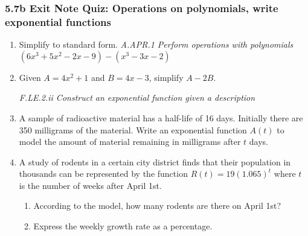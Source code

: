 \documentclass[12pt, twoside]{article}
\begin{document}
\subsubsection*{5.7b Exit Note Quiz: Operations on polynomials, write exponential functions}
\begin{enumerate}

\item Simplify to standard form. \hfill \emph{A.APR.1 Perform operations with polynomials} \\[0.25cm]
$(6x^3 + 5x^2 - 2x - 9) - (x^3 - 3x - 2)$ \vspace{4cm}

\item Given $A = 4x^2+1$ and $B = 4x-3$, simplify $A - 2B$. \vspace{5cm}


\; \hfill \emph{F.LE.2.ii Construct an exponential function given a description}
\item A sample of radioactive material has a half-life of 16 days. Initially there are 350 milligrams of the material. Write an exponential function $A(t)$ to model the amount of material remaining in milligrams after $t$ days. \vspace{2cm}

\item A study of rodents in a certain city district finds that their population in thousands can be represented by the function $R(t) = 19(1.065)^t$ where $t$ is the number of weeks after April 1st. 
\begin{enumerate}[itemsep=1.5cm]
    \item According to the model, how many rodents are there on April 1st?
    \item Express the weekly growth rate as a percentage.
\end{enumerate}  \vspace{2cm}

\end{enumerate}


\newpage
\end{document}
